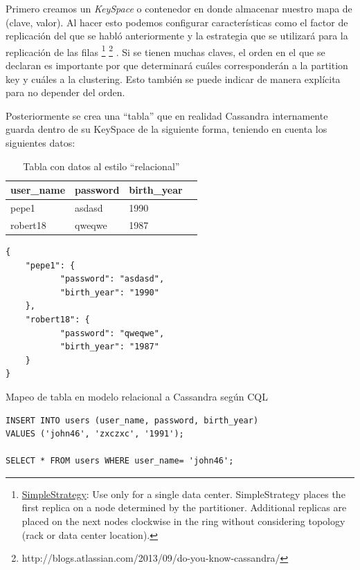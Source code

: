 \documentclass[11pt,a4paper]{article}
\begin{document}
Primero creamos un \textit{KeySpace} o contenedor en donde almacenar nuestro mapa de (clave, valor). Al hacer esto podemos configurar características como el factor de replicación del que se habló anteriormente y la estrategia que se utilizará para la replicación de las filas \footnote{ \href{http://docs.datastax.com/en/cassandra/2.0/cassandra/architecture/architectureDataDistributeReplication_c.html}{SimpleStrategy}:
Use only for a single data center. SimpleStrategy places the first replica on a node determined by the partitioner. Additional replicas are placed on the next nodes clockwise in the ring without considering topology (rack or data center location).} \footnote{http://blogs.atlassian.com/2013/09/do-you-know-cassandra/} . Si se tienen muchas claves, el orden en el que se declaran es importante por que determinará cuáles corresponderán a la partition key y cuáles a la clustering. Esto también se puede indicar de manera explícita para no depender del orden.

Posteriormente se crea una ``tabla'' que en realidad Cassandra internamente guarda dentro de su KeySpace de la siguiente forma, teniendo en cuenta los siguientes datos:

\begin{table}[h]
\centering
\caption{Tabla con datos al estilo ``relacional''}
\label{my-label}
\begin{tabular}{|l|l|l|l|}
\hline
user\_name & password & birth\_year \\ \hline
pepe1      & asdasd   & 1990        \\ \hline
robert18   & qweqwe   & 1987        \\ \hline
\end{tabular}
\end{table}

\begin{listing}
\begin{verbatim}
{
	"pepe1": {
           "password": "asdasd",
		   "birth_year": "1990"
    },
    "robert18": {
           "password": "qweqwe",
		   "birth_year": "1987"
    }
}
\end{verbatim}
\caption{Mapeo de tabla en modelo relacional a Cassandra según CQL} 
\label{json-example}
\end{listing}

\begin{lstlisting}
INSERT INTO users (user_name, password, birth_year)
VALUES ('john46', 'zxczxc', '1991');

SELECT * FROM users WHERE user_name= 'john46';
\end{lstlisting}
\end{document}
